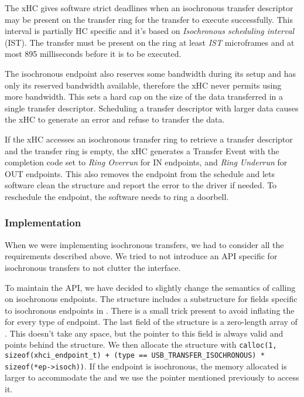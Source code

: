 The xHC gives software strict deadlines when an isochronous transfer descriptor
may be present on the transfer ring for the transfer to execute successfully.
This interval is partially HC specific and it's based on \textit{Isochronous
scheduling interval} (IST). The transfer must be present on the ring at least
\textit{IST} microframes and at most 895 milliseconds before it is to be
executed.

The isochronous endpoint also reserves some bandwidth during its setup and has
only its reserved bandwidth available, therefore the xHC never permits using
more bandwidth. This sets a hard cap on the size of the data transferred in a
single transfer descriptor. Scheduling a transfer descriptor with larger data
causes the xHC to generate an error and refuse to transfer the data.

If the xHC accesses an isochronous transfer ring to retrieve a transfer
descriptor and the transfer ring is empty, the xHC generates a Transfer Event
with the completion code set to \textit{Ring Overrun} for IN endpoints, and
\textit{Ring Underrun} for OUT endpoints. This also removes the endpoint from
the schedule and lets software clean the structure and report the error to the
driver if needed. To reschedule the endpoint, the software needs to ring a
doorbell.

\subsubsection{Implementation}

When we were implementing isochronous transfers, we had to consider all the
requirements described above. We tried to not introduce an API specific for
isochronous transfers to not clutter the interface.

To maintain the  API, we have decided to slightly change the
semantics of calling  on isochronous
endpoints. The  structure includes a substructure for
fields specific to isochronous endpoints in . There is a
small trick present to avoid inflating the  for every
type of endpoint. The last field of the structure is a zero-length array of
. This doesn't take any space, but the pointer to this
field is always valid and points behind the structure. We then allocate the
structure with \texttt{calloc(1, sizeof(xhci\_endpoint\_t) + (type ==
USB\_TRANSFER\_ISOCHRONOUS) * sizeof(*ep->isoch))}. If the endpoint is
isochronous, the memory allocated is larger to accommodate the
 and we use the pointer mentioned previously to access it.

